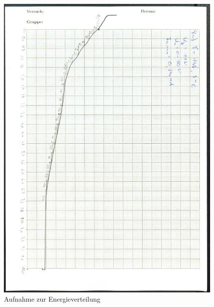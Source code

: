 \begin{figure}[H]
  \centering
  \includegraphics[width=\textwidth]{content/abKurve.jpg}
  \caption{Aufnahme zur Energieverteilung}
  \label{Bild:2}
\end{figure}
